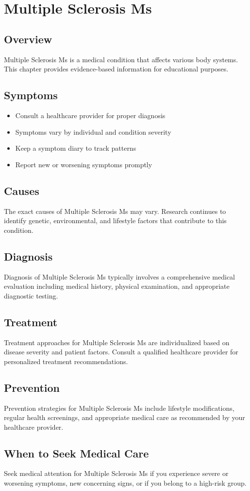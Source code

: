 \chapter{Multiple Sclerosis Ms}

\section*{Overview}
Multiple Sclerosis Ms is a medical condition that affects various body systems. This chapter provides evidence-based information for educational purposes.

\section*{Symptoms}
\begin{itemize}
  \item Consult a healthcare provider for proper diagnosis
  \item Symptoms vary by individual and condition severity
  \item Keep a symptom diary to track patterns
  \item Report new or worsening symptoms promptly
\end{itemize}

\section*{Causes}
The exact causes of Multiple Sclerosis Ms may vary. Research continues to identify genetic, environmental, and lifestyle factors that contribute to this condition.

\section*{Diagnosis}
Diagnosis of Multiple Sclerosis Ms typically involves a comprehensive medical evaluation including medical history, physical examination, and appropriate diagnostic testing.

\section*{Treatment}
Treatment approaches for Multiple Sclerosis Ms are individualized based on disease severity and patient factors. Consult a qualified healthcare provider for personalized treatment recommendations.

\section*{Prevention}
Prevention strategies for Multiple Sclerosis Ms include lifestyle modifications, regular health screenings, and appropriate medical care as recommended by your healthcare provider.

\section*{When to Seek Medical Care}
Seek medical attention for Multiple Sclerosis Ms if you experience severe or worsening symptoms, new concerning signs, or if you belong to a high-risk group.
\clearpage
